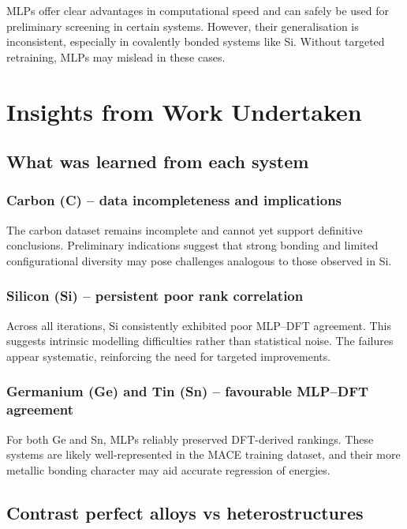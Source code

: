 MLPs offer clear advantages in computational speed and can safely be used for preliminary screening in certain systems. However, their generalisation is inconsistent, especially in covalently bonded systems like Si. Without targeted retraining, MLPs may mislead in these cases.


\section{Insights from Work Undertaken} \label{section:insights_from_work}

\subsection{What was learned from each system}

\subsubsection{Carbon (C) – data incompleteness and implications}

The carbon dataset remains incomplete and cannot yet support definitive conclusions. Preliminary indications suggest that strong bonding and limited configurational diversity may pose challenges analogous to those observed in Si.

\subsubsection{Silicon (Si) – persistent poor rank correlation}

Across all iterations, Si consistently exhibited poor MLP--DFT agreement. This suggests intrinsic modelling difficulties rather than statistical noise. The failures appear systematic, reinforcing the need for targeted improvements.

\subsubsection{Germanium (Ge) and Tin (Sn) – favourable MLP--DFT agreement}

For both Ge and Sn, MLPs reliably preserved DFT-derived rankings. These systems are likely well-represented in the MACE training dataset, and their more metallic bonding character may aid accurate regression of energies.

\subsection{Contrast perfect alloys vs heterostructures}

